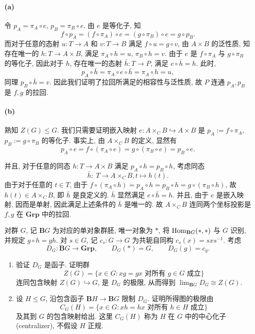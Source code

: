 \documentclass{article}
\begin{document}
\begin{solution}
	\paragraph{(a)} 令 $p_A = \pi_A \circ e$, $p_B = \pi_B \circ e$. 由 $e$ 是等化子, 知
	\[ f \circ p_A = (f \circ \pi_A) \circ e = (g \circ \pi_B) \circ e = g \circ p_B. \]
	而对于任意的态射 $u: T \to A$ 和 $v: T \to B$ 满足 $f \circ u = g \circ v$, 由 $A \times B$ 的泛性质, 知存在唯一的 $h: T \to A \times B$, 满足 $\pi_A \circ h = u$, $\pi_B \circ h = v$. 由于 $e$ 是 $f \circ \pi_A$ 与 $g \circ \pi_B$ 的等化子, 因此对于 $h$, 存在唯一的态射 $\bar{h}: T \to P$, 满足 $e \circ \bar{h} = h$. 此时, 
	\[ p_A \circ \bar{h} = \pi_A \circ e \circ \bar{h} = \pi_A \circ h = u, \]
	同理 $p_B \circ \bar{h} = v$. 因此我们证明了拉回所满足的相容性与泛性质, 故 $P$ 连通 $p_A, p_B$ 是 $f, g$ 的拉回.

	\paragraph{(b)} 熟知 $Z(G) \le G$. 我们只需要证明嵌入映射 $e: A \times_C B \hookrightarrow A \times B$ 是 $p_A := f \circ \pi_A$, $p_B := g \circ \pi_B$ 的等化子. 事实上, 由 $A \times_C B$ 的定义, 显然有 
	\[ p_A \circ e = f \circ (\pi_A \circ e) = g \circ (\pi_B \circ e) = p_B \circ e. \]

	并且, 对于任意的同态 $h: T \to A \times B$ 满足 $p_A \circ h = p_B \circ h$, 考虑同态
	\[ \bar{h}: \ T \to A \times_C B, t \mapsto h(t). \]
	由于对于任意的 $t \in T$, 由于 $f \circ (\pi_A \circ h) = p_A \circ h = p_B \circ h = g \circ (\pi_B \circ h)$, 故 $h(t) \in A \times_C B$, 即 $\bar{h}$ 是良定义的. $\bar{h}$ 显然满足 $e \circ \bar{h} = h$. 并且, 由于 $e$ 是嵌入映射, 因而是单射, 因此满足上述条件的 $\bar{h}$ 是唯一的. 故 $A \times_C B$ 连同两个坐标投影是 $f, g$ 在 $\mathbf{Grp}$ 中的拉回.
\end{solution}



\begin{problem}
对群 $G$, 记 $\mathbf BG$ 为对应的单对象群胚, 唯一对象为 $*$, 将 $\operatorname{Hom}_{\mathbf BG}(*,*)$ 与 $G$ 识别, 并规定 $g\circ h=gh$. 对 $s\in G$, 记 $c_s:G\to G$ 为共轭自同构 $c_s(x)=sxs^{-1}$. 考虑
\[
  D_G:\mathbf BG\longrightarrow\mathbf{Grp},\qquad D_G(*)=G,\qquad D_G(g)=c_g.
\]
\begin{enumerate}
  \item[(a)] 验证 $D_G$ 是函子. 证明群
  \[
    Z(G)=\{x\in G:xg=gx\text{ 对所有 }g\in G\text{ 成立}\}
  \]
  连同包含映射 $Z(G)\hookrightarrow G$, 是 $D_G$ 的极限, 从而得到 $\lim_{\mathbf BG}D_G\cong Z(G)$.
  \item[(b)] 设 $H\le G$, 沿包含函子 $\mathbf BH\to\mathbf BG$ 限制 $D_G$. 证明所得图的极限由
  \[
    C_G(H)=\{x\in G:xh=hx\text{ 对所有 }h\in H\text{ 成立}\}
  \]
  及其到 $G$ 的包含映射给出. 这里 $C_G(H)$ 称为 $H$ 在 $G$ 中的中心化子 (centralizer), 不假设 $H$ 正规.
\end{enumerate}
\end{problem}
\end{document}
